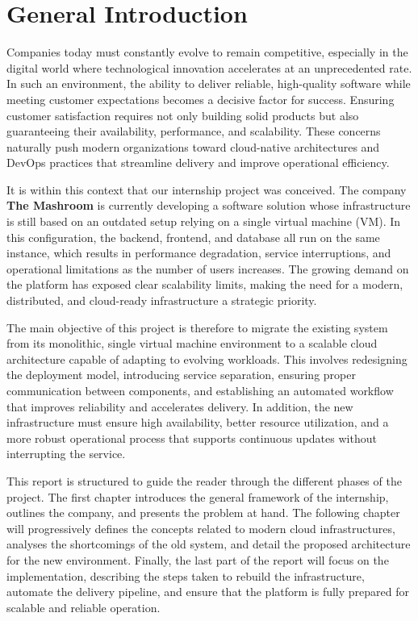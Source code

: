 \thispagestyle{plain}
\section*{General Introduction}

Companies today must constantly evolve to remain competitive, especially in the digital
world where technological innovation accelerates at an unprecedented rate. In such an
environment, the ability to deliver reliable, high-quality software while meeting customer
expectations becomes a decisive factor for success. Ensuring customer satisfaction requires
not only building solid products but also guaranteeing their availability, performance,
and scalability. These concerns naturally push modern organizations toward cloud-native
architectures and DevOps practices that streamline delivery and improve operational
efficiency.

It is within this context that our internship project was conceived. The company
\textbf{The Mashroom} is currently developing a software solution whose infrastructure
is still based on an outdated setup relying on a single virtual machine (VM). In this
configuration, the backend, frontend, and database all run on the same instance, which
results in performance degradation, service interruptions, and operational limitations as
the number of users increases. The growing demand on the platform has exposed clear
scalability limits, making the need for a modern, distributed, and cloud-ready infrastructure
a strategic priority.

The main objective of this project is therefore to migrate the existing system from its
monolithic, single virtual machine environment to a scalable cloud architecture capable of adapting
to evolving workloads. This involves redesigning the deployment model, introducing
service separation, ensuring proper communication between components, and establishing
an automated workflow that improves reliability and accelerates delivery. In addition,
the new infrastructure must ensure high availability, better resource utilization, and a
more robust operational process that supports continuous updates without interrupting the
service.

This report is structured to guide the reader through the different phases of the project.
The first chapter introduces the general framework of the internship, outlines the company,
and presents the problem at hand. The following chapter will progressively defines the
concepts related to modern cloud infrastructures, analyses the shortcomings of the old
system, and detail the proposed architecture for the new environment. Finally, the last
part of the report will focus on the implementation, describing the steps taken to rebuild
the infrastructure, automate the delivery pipeline, and ensure that the platform is fully
prepared for scalable and reliable operation.

\newpage